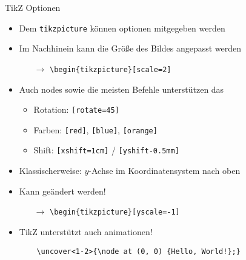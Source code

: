 \documentclass[main.tex]{subfiles}
\begin{document}
\begin{frame}[fragile]{TikZ Optionen}
    \begin{itemize}
        \item Dem \verb|tikzpicture| können optionen mitgegeben werden
        \pause
        \medskip
        \item Im Nachhinein kann die Größe des Bildes angepasst werden
        \begin{itemize}
            \item[$\to$] \verb|\begin{tikzpicture}[scale=2]|
        \end{itemize}
        \pause
        \medskip
        \item Auch nodes sowie die meisten Befehle unterstützen das
        \begin{itemize}
            \item Rotation: \texttt{[rotate=45]}
            \item Farben: \texttt{[red]}, \texttt{[blue]}, \texttt{[orange]}
            \item Shift: \texttt{[xshift=1cm]} / \texttt{[yshift-0.5mm]}
        \end{itemize}
        \pause
        \medskip
        \item Klassischerweise: $y$-Achse im Koordinatensystem nach oben
        \item Kann geändert werden!
        \begin{itemize}
            \item[$\to$] \verb|\begin{tikzpicture}[yscale=-1]|
        \end{itemize}
        \pause
        \medskip
        \item TikZ unterstützt auch animationen!
        \begin{verbatim}
    \uncover<1-2>{\node at (0, 0) {Hello, World!};}
        \end{verbatim}
    \end{itemize}
\end{frame}
\end{document}
